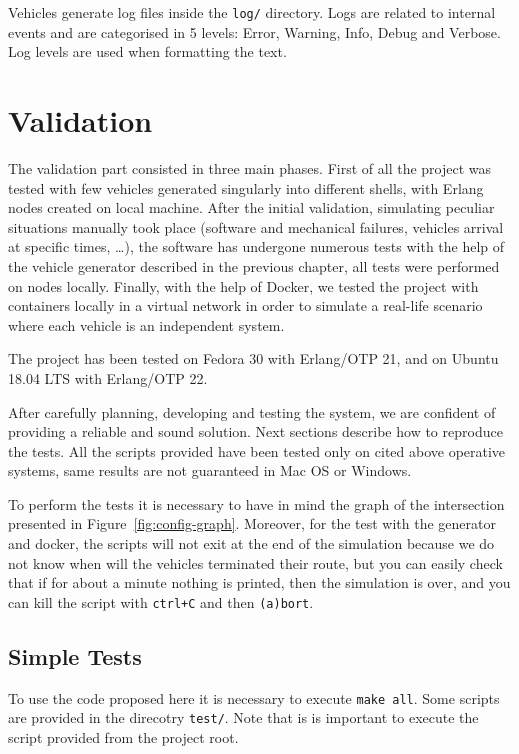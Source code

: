 \documentclass{memoir}
\begin{document}
\bigskip
Vehicles generate log files inside the \verb|log/| directory. Logs are related to internal events and are categorised in 5 levels: Error, Warning, Info, Debug and Verbose. Log levels are used when formatting the text. 


\chapter{Validation}\label{ch:validation}
The validation part consisted in three main phases. First of all the project was tested with few vehicles generated singularly into different shells, with Erlang nodes created on local machine. After the initial validation, simulating peculiar situations manually took place (software and mechanical failures, vehicles arrival at specific times, \dots), the software has undergone numerous tests with the help of the vehicle generator described in the previous chapter, all tests were performed on nodes locally. Finally, with the help of Docker, we tested the project with containers locally in a virtual network in order to simulate a real-life scenario where each vehicle is an independent system.

The project has been tested on Fedora 30 with Erlang/OTP 21, and on Ubuntu 18.04 LTS with Erlang/OTP 22.

After carefully planning, developing and testing the system, we are confident of providing a reliable and sound solution. Next sections describe how to reproduce the tests. All the scripts provided have been tested only on cited above operative systems, same results are not guaranteed in Mac OS or Windows.

To perform the tests it is necessary to have in mind the graph of the intersection presented in Figure~\ref{fig:config-graph}. Moreover, for the test with the generator and docker, the scripts will not exit at the end of the simulation because we do not know when will the vehicles terminated their route, but you can easily check that if for about a minute nothing is printed, then the simulation is over, and you can kill the script with \verb|ctrl+C| and then \verb|(a)bort|.

\section{Simple Tests}
To use the code proposed here it is necessary to execute \texttt{make all}. Some scripts are provided in the direcotry \texttt{test/}. Note that is is important to execute the script provided from the project root.
\end{document}
